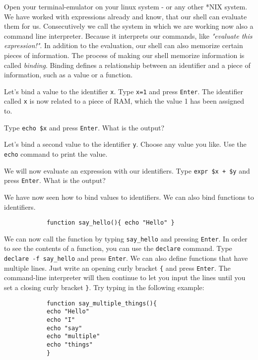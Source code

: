 \begin{challenge}
    \begin{task}
        Open your terminal-emulator on your linux system - or any other *NIX system.
        We have worked with expressions already and know, that our shell can evaluate them for us.
        Consecutively we call the system in which we are working now also a command line interpreter.
        Because it interprets our commands, like \textit{"evaluate this expression!"}.
        In addition to the evaluation, our shell can also memorize certain pieces of information.
        The process of making our shell memorize information is called \textit{binding}.
        Binding defines a relationship between an identifier and a piece of information, such as a value or a function.        
        \begin{questions}
            \item Let's bind a value to the identifier \texttt{x}. Type \texttt{x=1} and press \texttt{Enter}. The identifier called \texttt{x} is now related to a piece of RAM, which the value 1 has been assigned to.
            \item Type \texttt{echo \$x} and press \texttt{Enter}. What is the output?
            \item Let's bind a second value to the identifier \texttt{y}. Choose any value you like. Use the \texttt{echo} command to print the value.
            \item We will now evaluate an expression with our identifiers. Type \texttt{expr \$x + \$y} and press \texttt{Enter}. What is the output?
        \end{questions}
    \end{task}

    \begin{task}
        We have now seen how to bind values to identifiers.
        We can also bind functions to identifiers.
        \begin{lstlisting}
            function say_hello(){ echo "Hello" }
        \end{lstlisting}
        We can now call the function by typing \texttt{say_hello} and pressing \texttt{Enter}.
        In order to see the contents of a function, you can use the \texttt{declare} command. Type \texttt{declare -f say_hello} and press \texttt{Enter}.
        We can also define functions that have multiple lines. 
        Just write an opening curly bracket \texttt{\{} and press \texttt{Enter}.
        The command-line interpreter will then continue to let you input the lines until you set a closing curly bracket \texttt{\}}.
        Try typing in the following example:
        \begin{lstlisting}
            function say_multiple_things(){
            echo "Hello"
            echo "I"
            echo "say"
            echo "multiple"
            echo "things"
            }
        \end{lstlisting}
    \end{task}


\end{challenge}

